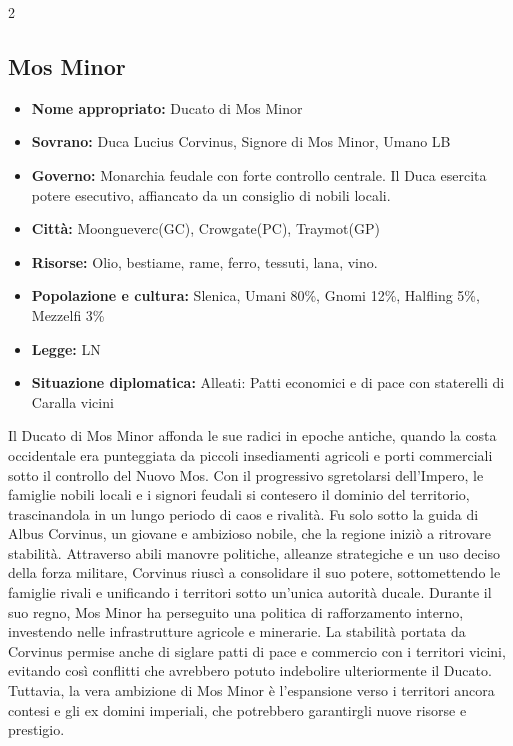 \documentclass[10pt, a4paper]{report}
\begin{document}
\begin{multicols}{2}
\subsection*{Mos Minor}
\begin{itemize}
	\item \textbf{Nome appropriato:} Ducato di Mos Minor
	\item \textbf{Sovrano:} Duca Lucius Corvinus, Signore di Mos Minor, Umano LB
	\item \textbf{Governo:} Monarchia feudale con forte controllo centrale. Il Duca esercita potere esecutivo, affiancato da un consiglio di nobili locali.
	\item \textbf{Città:} Moongueverc(GC), Crowgate(PC), Traymot(GP)
	\item \textbf{Risorse:} Olio, bestiame, rame, ferro, tessuti, lana, vino.  
	\item \textbf{Popolazione e cultura:} Slenica, Umani 80\%, Gnomi 12\%, Halfling 5\%, Mezzelfi 3\%
	\item \textbf{Legge:} LN
	\item \textbf{Situazione diplomatica:} Alleati: Patti economici e di pace con staterelli di Caralla vicini
\end{itemize}
Il Ducato di Mos Minor affonda le sue radici in epoche antiche, quando la costa occidentale era punteggiata da piccoli insediamenti agricoli e porti commerciali sotto il controllo del Nuovo Mos. Con il progressivo sgretolarsi dell’Impero, le famiglie nobili locali e i signori feudali si contesero il dominio del territorio, trascinandola in un lungo periodo di caos e rivalità.
Fu solo sotto la guida di Albus Corvinus, un giovane e ambizioso nobile, che la regione iniziò a ritrovare stabilità. Attraverso abili manovre politiche, alleanze strategiche e un uso deciso della forza militare, Corvinus riuscì a consolidare il suo potere, sottomettendo le famiglie rivali e unificando i territori sotto un’unica autorità ducale.
Durante il suo regno, Mos Minor ha perseguito una politica di rafforzamento interno, investendo nelle infrastrutture agricole e minerarie. La stabilità portata da Corvinus permise anche di siglare patti di pace e commercio con i territori vicini, evitando così conflitti che avrebbero potuto indebolire ulteriormente il Ducato. Tuttavia, la vera ambizione di Mos Minor è l’espansione verso i territori ancora contesi e gli ex domini imperiali, che potrebbero garantirgli nuove risorse e prestigio.


\end{multicols}
\end{document}
